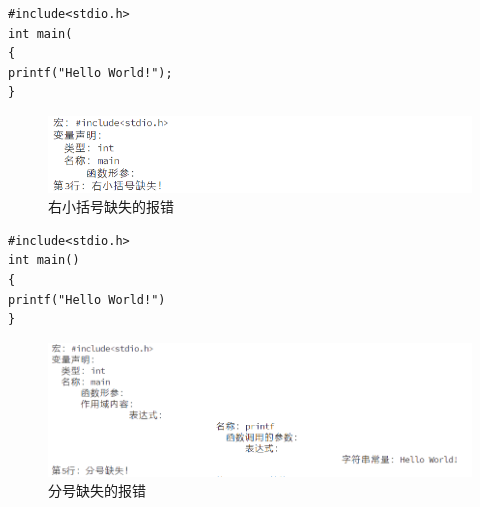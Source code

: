 \documentclass[supercite]{Experimental_Report}
\theoremstyle{definition}
\begin{document}
\begin{lstlisting}[title=语法错误：右小括号缺失,frame=none]
#include<stdio.h>
int main(
{
printf("Hello World!");
}
\end{lstlisting}

\begin{figure}[htb]
	\begin{center}
		\includegraphics[scale=1]{images/报错4.png}
		\caption{右小括号缺失的报错}
		\label{fig2-4}
	\end{center}
\end{figure}

\begin{lstlisting}[title=语法错误：分号缺失,frame=none]
#include<stdio.h>
int main()
{
printf("Hello World!")
}
\end{lstlisting}

\begin{figure}[htb]
	\begin{center}
		\includegraphics[scale=1]{images/报错5.png}
		\caption{分号缺失的报错}
		\label{fig2-5}
	\end{center}
\end{figure}
	
\end{document}
